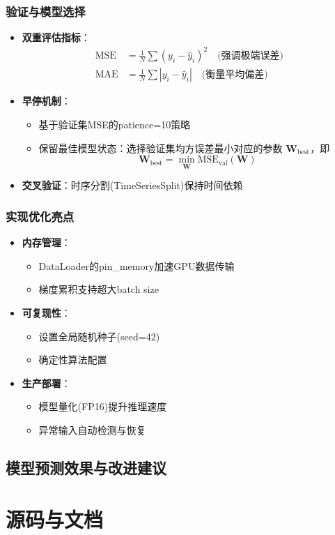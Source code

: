 \documentclass[a4paper,12pt]{ctexart}
\begin{document}
\subsubsection{验证与模型选择}
\begin{itemize}
\item \textbf{双重评估指标}：
  \begin{align*}
  \text{MSE} &= \frac{1}{N}\sum(y_i-\hat{y}_i)^2 \quad \text{(强调极端误差)} \\
  \text{MAE} &= \frac{1}{N}\sum|y_i-\hat{y}_i| \quad \text{(衡量平均偏差)}
  \end{align*}
  
\item \textbf{早停机制}：
  \begin{itemize}
  \item 基于验证集MSE的patience=10策略
    \item 保留最佳模型状态：选择验证集均方误差最小对应的参数 $\mathbf{W}_{\text{best}}$，即
        \[
        \mathbf{W}_{\text{best}} = \min_{\mathbf{W}} \text{MSE}_{\text{val}}(\mathbf{W})
        \]
  \end{itemize}
  
\item \textbf{交叉验证}：时序分割(TimeSeriesSplit)保持时间依赖
\end{itemize}

\subsubsection{实现优化亮点}
\begin{itemize}
\item \textbf{内存管理}：
  \begin{itemize}
  \item DataLoader的pin\_memory加速GPU数据传输
  \item 梯度累积支持超大batch size
  \end{itemize}
  
\item \textbf{可复现性}：
  \begin{itemize}
  \item 设置全局随机种子(seed=42)
  \item 确定性算法配置
  \end{itemize}
  
\item \textbf{生产部署}：
  \begin{itemize}
  \item 模型量化(FP16)提升推理速度
  \item 异常输入自动检测与恢复
  \end{itemize}
\end{itemize}

\newpage
\subsection{模型预测效果与改进建议}

\newpage
\section{源码与文档}
\end{document}
